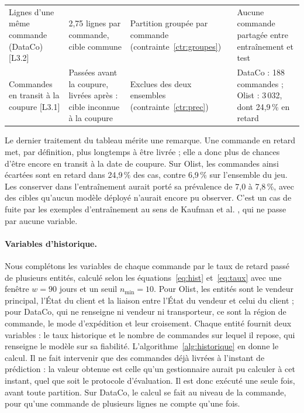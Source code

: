 \documentclass[11pt,a4paper]{article}
\theoremstyle{definition}
\begin{document}
\begin{table}[!htbp]
\begin{tabularx}{\textwidth}{@{}L{2.9cm}L{3.6cm}L{4.0cm}>{\raggedright\arraybackslash}X@{}}
Lignes d'une même commande (DataCo) [L3.2] & 2,75 lignes par commande, cible commune & Partition groupée par commande (contrainte~\ref{ctr:groupes}) & Aucune commande partagée entre entraînement et test \\
Commandes en transit à la coupure [L3.1] & Passées avant la coupure, livrées après : cible inconnue à la coupure & Exclues des deux ensembles (contrainte~\ref{ctr:prec}) & DataCo : 188 commandes ; Olist : 3\,032, dont 24,9\,\% en retard \\
\bottomrule
\end{tabularx}
\end{table}

Le dernier traitement du tableau mérite une remarque. Une commande en retard met, par définition, plus longtemps à être livrée ; elle a donc plus de chances d'être encore en transit à la date de coupure. Sur Olist, les commandes ainsi écartées sont en retard dans 24,9\,\% des cas, contre 6,9\,\% sur l'ensemble du jeu. Les conserver dans l'entraînement aurait porté sa prévalence de 7,0 à 7,8\,\%, avec des cibles qu'aucun modèle déployé n'aurait encore pu observer. C'est un cas de fuite par les exemples d'entraînement au sens de Kaufman et al. \cite{kaufman2012leakage}, qui ne passe par aucune variable.

\paragraph{Variables d'historique.} Nous complétons les variables de chaque commande par le taux de retard passé de plusieurs entités, calculé selon les équations~\eqref{eq:hist} et~\eqref{eq:taux} avec une fenêtre $w = 90$ jours et un seuil $n_{\min} = 10$. Pour Olist, les entités sont le vendeur principal, l'État du client et la liaison entre l'État du vendeur et celui du client ; pour DataCo, qui ne renseigne ni vendeur ni transporteur, ce sont la région de commande, le mode d'expédition et leur croisement. Chaque entité fournit deux variables : le taux historique et le nombre de commandes sur lequel il repose, qui renseigne le modèle sur sa fiabilité. L'algorithme~\ref{alg:historique} en donne le calcul. Il ne fait intervenir que des commandes déjà livrées à l'instant de prédiction : la valeur obtenue est celle qu'un gestionnaire aurait pu calculer à cet instant, quel que soit le protocole d'évaluation. Il est donc exécuté une seule fois, avant toute partition. Sur DataCo, le calcul se fait au niveau de la commande, pour qu'une commande de plusieurs lignes ne compte qu'une fois.
\end{document}
